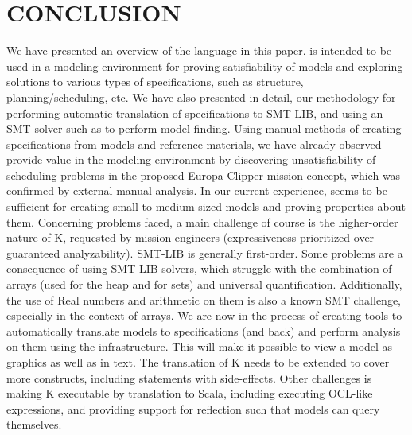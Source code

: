 \section{CONCLUSION}
\label{sec:conclusion}

We have presented an overview of the \Klang{} language in this
paper. \Klang{} is intended to be used in a modeling environment for
proving satisfiability of \sysml{} models and exploring solutions to
various types of specifications, such as structure,
planning/scheduling, etc. We have also presented in detail, our
methodology for performing automatic translation of \Klang{}
specifications to SMT-LIB, and using an SMT solver such as \zthree{}
to perform model finding. Using manual methods of creating \Klang{}
specifications from \sysml{} models and reference materials, we have
already observed \Klang{} provide value in the modeling environment by
discovering unsatisfiability of scheduling problems in the proposed
Europa Clipper mission concept, which was confirmed by external manual
analysis.  In our current experience, \Klang{} seems to be sufficient
for creating small to medium sized \sysml{} models and proving
properties about them.
%
Concerning problems faced, a main challenge of course is the
higher-order nature of K, requested by mission engineers
(expressiveness prioritized over guaranteed analyzability).  SMT-LIB
is generally first-order.  Some problems are a consequence of using
SMT-LIB solvers, which struggle with the combination of arrays (used
for the heap and for sets) and universal quantification. Additionally,
the use of Real numbers and arithmetic on them is also a known SMT
challenge, especially in the context of arrays.
%
We are now in the process of creating tools to automatically translate
\sysml{} models to \Klang{} specifications (and back) and perform analysis on
them using the \Klang{} infrastructure. This will make it possible to view
a model as graphics as well as in text. The translation of K needs to
be extended to cover more constructs, including statements with
side-effects. Other challenges is making K executable by translation
to Scala, including executing OCL-like expressions,
and providing support for reflection such that models can query themselves.

